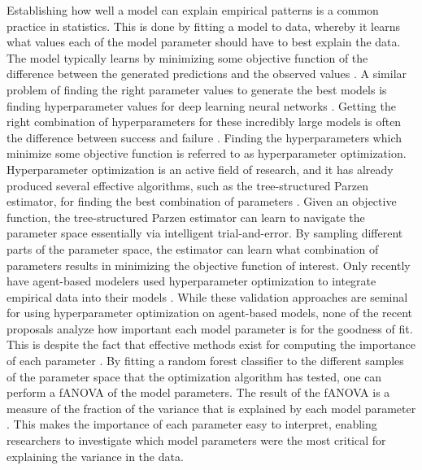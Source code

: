 \documentclass[11pt]{article}
\begin{document}
\noindent Establishing how well a model can explain empirical patterns is a common practice in statistics. This is done by fitting a model to data, whereby it learns what values each of the model parameter should have to best explain the data. The model typically learns by minimizing some objective function of the difference between the generated predictions and the observed values \cite{akiba_optuna_2019}. A similar problem of finding the right parameter values to generate the best models is finding hyperparameter values for deep learning neural networks \cite{bergstra_algorithms_2011}. Getting the right combination of hyperparameters for these incredibly large models is often the difference between success and failure \cite{akiba_optuna_2019,bergstra_algorithms_2011}. Finding the hyperparameters which minimize some objective function is referred to as hyperparameter optimization. Hyperparameter optimization is an active field of research, and it has already produced several effective algorithms, such as the tree-structured Parzen estimator, for finding the best combination of parameters \cite{akiba_optuna_2019, bergstra_algorithms_2011, hutter2014efficient}. Given an objective function, the tree-structured Parzen estimator can learn to navigate the parameter space essentially via intelligent trial-and-error. By sampling different parts of the parameter space, the estimator can learn what combination of parameters results in minimizing the objective function of interest. Only recently have agent-based modelers used hyperparameter optimization to integrate empirical data into their models \cite{kerr2021covasim, krivorotko2022agent}. While these validation approaches are seminal for using hyperparameter optimization on agent-based models, none of the recent proposals analyze how important each model parameter is for the goodness of fit. This is despite the fact that effective methods exist for computing the importance of each parameter \cite{hutter2014efficient}. By fitting a random forest classifier to the different samples of the parameter space that the optimization algorithm has tested, one can perform a fANOVA of the model parameters. The result of the fANOVA is a measure of the fraction of the variance that is explained by each model parameter \cite{hutter2014efficient}. This makes the importance of each parameter easy to interpret, enabling researchers to investigate which model parameters were the most critical for explaining the variance in the data.
\end{document}
